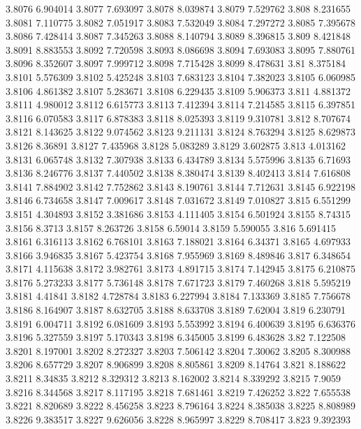 3.8076  6.904014
3.8077  7.693097
3.8078  8.039874
3.8079  7.529762
3.808  8.231655
3.8081  7.110775
3.8082  7.051917
3.8083  7.532049
3.8084  7.297272
3.8085  7.395678
3.8086  7.428414
3.8087  7.345263
3.8088  8.140794
3.8089  8.396815
3.809  8.421848
3.8091  8.883553
3.8092  7.720598
3.8093  8.086698
3.8094  7.693083
3.8095  7.880761
3.8096  8.352607
3.8097  7.999712
3.8098  7.715428
3.8099  8.478631
3.81  8.375184
3.8101  5.576309
3.8102  5.425248
3.8103  7.683123
3.8104  7.382023
3.8105  6.060985
3.8106  4.861382
3.8107  5.283671
3.8108  6.229435
3.8109  5.906373
3.811  4.881372
3.8111  4.980012
3.8112  6.615773
3.8113  7.412394
3.8114  7.214585
3.8115  6.397851
3.8116  6.070583
3.8117  6.878383
3.8118  8.025393
3.8119  9.310781
3.812  8.707674
3.8121  8.143625
3.8122  9.074562
3.8123  9.211131
3.8124  8.763294
3.8125  8.629873
3.8126  8.36891
3.8127  7.435968
3.8128  5.083289
3.8129  3.602875
3.813  4.013162
3.8131  6.065748
3.8132  7.307938
3.8133  6.434789
3.8134  5.575996
3.8135  6.71693
3.8136  8.246776
3.8137  7.440502
3.8138  8.380474
3.8139  8.402413
3.814  7.616808
3.8141  7.884902
3.8142  7.752862
3.8143  8.190761
3.8144  7.712631
3.8145  6.922198
3.8146  6.734658
3.8147  7.009617
3.8148  7.031672
3.8149  7.010827
3.815  6.551299
3.8151  4.304893
3.8152  3.381686
3.8153  4.111405
3.8154  6.501924
3.8155  8.74315
3.8156  8.3713
3.8157  8.263726
3.8158  6.59014
3.8159  5.590055
3.816  5.691415
3.8161  6.316113
3.8162  6.768101
3.8163  7.188021
3.8164  6.34371
3.8165  4.697933
3.8166  3.946835
3.8167  5.423754
3.8168  7.955969
3.8169  8.489846
3.817  6.348654
3.8171  4.115638
3.8172  3.982761
3.8173  4.891715
3.8174  7.142945
3.8175  6.210875
3.8176  5.273233
3.8177  5.736148
3.8178  7.671723
3.8179  7.460268
3.818  5.595219
3.8181  4.41841
3.8182  4.728784
3.8183  6.227994
3.8184  7.133369
3.8185  7.756678
3.8186  8.164907
3.8187  8.632705
3.8188  8.633708
3.8189  7.62004
3.819  6.230791
3.8191  6.004711
3.8192  6.081609
3.8193  5.553992
3.8194  6.400639
3.8195  6.636376
3.8196  5.327559
3.8197  5.170343
3.8198  6.345005
3.8199  6.483628
3.82  7.122508
3.8201  8.197001
3.8202  8.272327
3.8203  7.506142
3.8204  7.30062
3.8205  8.300988
3.8206  8.657729
3.8207  8.906899
3.8208  8.805861
3.8209  8.14764
3.821  8.188622
3.8211  8.34835
3.8212  8.329312
3.8213  8.162002
3.8214  8.339292
3.8215  7.9059
3.8216  8.344568
3.8217  8.117195
3.8218  7.681461
3.8219  7.426252
3.822  7.655538
3.8221  8.820689
3.8222  8.456258
3.8223  8.796164
3.8224  8.385038
3.8225  8.808989
3.8226  9.383517
3.8227  9.626056
3.8228  8.965997
3.8229  8.708417
3.823  9.392393
